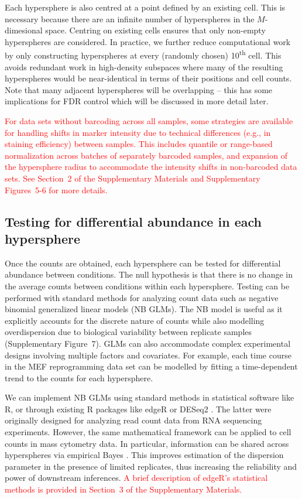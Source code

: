 \documentclass{article}
\newcommand\revised[1]{\textcolor{red}{#1}}
\newcommand{\suppintnorm}{2}
\newcommand{\suppedgeR}{3}
\newcommand{\suppfigintnorm}{5-6}
\newcommand{\suppfignbdisp}{7}
\begin{document}
Each hypersphere is also centred at a point defined by an existing cell.
This is necessary because there are an infinite number of hyperspheres in the $M$-dimesional space.
Centring on existing cells ensures that only non-empty hyperspheres are considered.
In practice, we further reduce computational work by only constructing hyperspheres at every (randomly chosen) 10\textsuperscript{th} cell.
This avoids redundant work in high-density subspaces where many of the resulting hyperspheres would be near-identical in terms of their positions and cell counts.
Note that many adjacent hyperspheres will be overlapping -- this has some implications for FDR control which will be discussed in more detail later.

\revised{For data sets without barcoding across all samples, some strategies are available for handling shifts in marker intensity due to technical differences (e.g., in staining efficiency) between samples.
This includes quantile or range-based normalization across batches of separately barcoded samples, and expansion of the hypersphere radius to accommodate the intensity shifts in non-barcoded data sets. 
See Section~\suppintnorm{} of the Supplementary Materials and Supplementary Figures~\suppfigintnorm{} for more details.}    

\subsection{Testing for differential abundance in each hypersphere}
Once the counts are obtained, each hypersphere can be tested for differential abundance between conditions.
The null hypothesis is that there is no change in the average counts between conditions within each hypersphere.
Testing can be performed with standard methods for analyzing count data such as negative binomial generalized linear models (NB GLMs).
The NB model is useful as it explicitly accounts for the discrete nature of counts while also modelling overdispersion due to biological variability between replicate samples (Supplementary Figure~\suppfignbdisp{}).
GLMs can also accommodate complex experimental designs involving multiple factors and covariates.
For example, each time course in the MEF reprogramming data set can be modelled by fitting a time-dependent trend to the counts for each hypersphere.

We can implement NB GLMs using standard methods in statistical software like R, or through existing R packages like edgeR \cite{robinson2010edgeR} or DESeq2 \cite{love2014moderated}.
The latter were originally designed for analyzing read count data from RNA sequencing experiments.
However, the same mathematical framework can be applied to cell counts in mass cytometry data.
In particular, information can be shared across hyperspheres via empirical Bayes \cite{mccarthy2012differential, lund2012detecting}.
This improves estimation of the dispersion parameter in the presence of limited replicates, thus increasing the reliability and power of downstream inferences.
\revised{A brief description of edgeR's statistical methods is provided in Section~\suppedgeR{} of the Supplementary Materials.}
\end{document}
